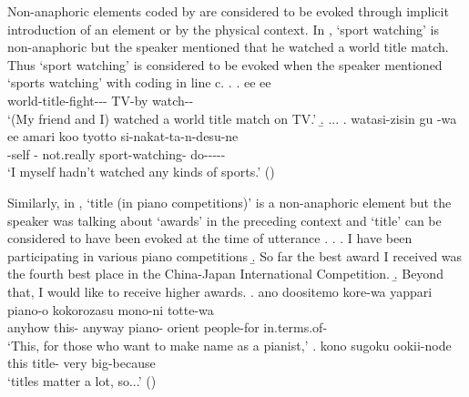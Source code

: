 
Non-anaphoric elements coded by  are considered to be evoked
through implicit introduction of an element or by the physical context.
In \Next,
 `sport watching' is non-anaphoric
but the speaker mentioned that he watched a world title match.
Thus `sport watching' is considered to be evoked
when the speaker mentioned `sports watching' with  coding in line c.
%
\ex. \ag. ee  ee   \\
		 world-title-fight---  TV-by watch-- \\
		`(My friend and I) watched a world title match on TV.'
	\b. ...
	\bg. watasi-zisin gu -wa ee amari koo  tyotto si-nakat-ta-n-desu-ne \\
		-self  -  not.really  sport-watching-  do----- \\
		`I myself hadn't watched any kinds of sports.' \hfill{()}
%	

Similarly, in \Next,
 `title (in piano competitions)' is a non-anaphoric element
but the speaker was talking about `awards' in the preceding context
and `title' can be considered to have been evoked at the time of utterance \Next[e].
%
\ex. \a. I have been participating in various piano competitions
	\b. So far the best award I received was the fourth best place in the China-Japan International Competition.
	\b. Beyond that, I would like to receive higher awards.
	\bg. ano doositemo kore-wa yappari piano-o kokorozasu mono-ni totte-wa \\
		 anyhow this- anyway piano- orient people-for in.terms.of- \\
		`This, for those who want to make name as a pianist,'
	\bg. kono  sugoku ookii-node \\
		this title- very big-because \\
		`titles matter a lot, so...'
\hfill{()}
%

